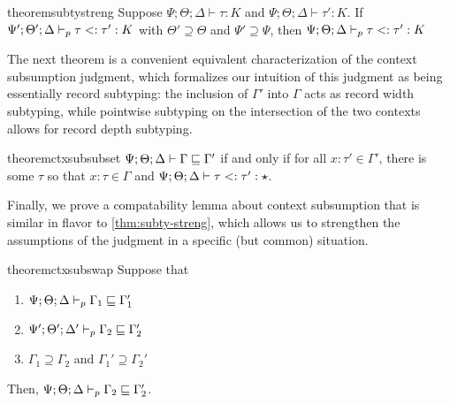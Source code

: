 \begin{restatable}{theorem}{subtystreng}
\label{thm:subty-streng}
Suppose $\Psi ; \Theta ; \Delta \vdash \tau : K$ and $\Psi ; \Theta ; \Delta \vdash \tau' : K$.
If $\Psi' ; \Theta' ; \Delta \vdash_p \tau <: \tau' : K$ with $\Theta' \supseteq \Theta$ and $\Psi' \supseteq \Psi$, then $\Psi ; \Theta ; \Delta \vdash_p \tau <: \tau' : K$
\end{restatable}

The next theorem is a convenient equivalent characterization of the context subsumption judgment, which formalizes our intuition of this judgment as being essentially record subtyping: the inclusion of $\Gamma'$ into $\Gamma$ acts as record width subtyping, while pointwise subtyping on the intersection of the two contexts allows for record depth subtyping.

\begin{restatable}{theorem}{ctxsubsubset}
\label{thm:ctx-sub-subset2}
$\Psi ; \Theta ; \Delta \vdash \Gamma \sqsubseteq \Gamma'$ if and only if for all $x : \tau' \in \Gamma'$, there is some $\tau$ so that $x : \tau \in \Gamma$ and $\Psi ; \Theta ; \Delta \vdash \tau <: \tau' : \star$.
\end{restatable}

Finally, we prove a compatability lemma about context subsumption that is similar in flavor to \autoref{thm:subty-streng}, which allows us to strengthen the assumptions of the judgment in a specific (but common) situation.

\begin{restatable}{theorem}{ctxsubswap}
\label{thm:ctx-sub-swap}
Suppose that
\begin{enumerate}
  \item $\Psi ; \Theta ; \Delta \vdash_p \Gamma_1 \sqsubseteq \Gamma_1'$
  \item $\Psi' ; \Theta' ;  \Delta' \vdash_p \Gamma_2 \sqsubseteq \Gamma_2'$
  \item $\Gamma_1 \supseteq \Gamma_2$ and $\Gamma_1' \supseteq \Gamma_2'$
\end{enumerate}
Then, $\Psi ; \Theta ; \Delta \vdash_p \Gamma_2 \sqsubseteq \Gamma_2'$.
\end{restatable}


